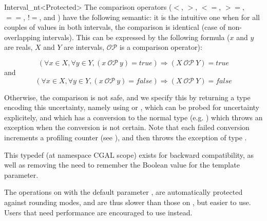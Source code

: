 \begin{ccRefClass}{Interval_nt<Protected>}
The comparison operators ($<$, $>$, $<=$, $>=$, $==$, $!=$, 
and ) have the following semantic: it is the intuitive
one when for all couples of values in both intervals, the comparison
is identical (case of non-overlapping intervals).  This can be expressed
by the following formula ($x$ and $y$ are reals, $X$ and $Y$ are
intervals, $\mathcal{OP}$ is a comparison operator):

$$
\left(\forall x \in X, \forall y \in Y, (x\ \mathcal{OP}\ y) = true\right)
\Rightarrow (X\ \mathcal{OP}\ Y) = true
$$
and
$$
\left(\forall x \in X, \forall y \in Y, (x\ \mathcal{OP}\ y) = false\right)
\Rightarrow (X\ \mathcal{OP}\ Y) =false
$$

Otherwise, the comparison is not safe, and we specify this by returning
a type encoding this uncertainty, namely using 
or , which
can be probed for uncertainty explicitely, and which has a conversion to
the normal type (e.g. ) which throws an exception when the
conversion is not certain.  Note that each failed conversion increments
a profiling counter (see ), and then throws the exception of
type .

\ccGlue
{}
\ccGlue
{}
\ccGlue
{}
\ccGlue
{}
\ccGlue
{}
\ccGlue
{}
\ccGlue
{}

{This typedef (at namespace CGAL scope) exists for backward compatibility,
 as well as removing the need to remember the Boolean value for the template
 parameter.}

\begin{ccAdvanced}

\ccImplementation

The operations on  with the default parameter ,
are automatically protected against rounding modes, and are thus slower than
those on , but easier to use.  Users that need
performance are encouraged to use  instead.


\end{ccAdvanced}
\end{ccRefClass}
